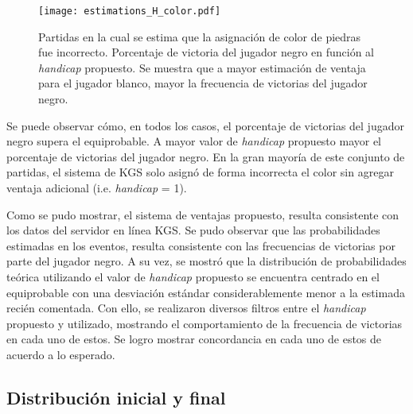 \documentclass[11pt,twoside,spanish]{report} %
\begin{document}
\begin{figure}[H]
    \centering
    \texttt{[image: estimations\_H\_color.pdf]}
    \caption{Partidas en la cual se estima que la asignaci\'on de color de piedras fue incorrecto. Porcentaje de victoria del jugador negro en funci\'on al \textit{handicap} propuesto.  Se muestra que a mayor estimaci\'on de ventaja para el jugador blanco,  mayor la frecuencia de victorias del jugador negro.}
    \label{fig:estimations_H_color}
\end{figure}

Se puede observar c\'omo, en todos los casos, el porcentaje de victorias del jugador negro supera el equiprobable. 
A mayor valor de \textit{handicap} propuesto mayor el porcentaje de victorias del jugador negro.
En la gran mayor\'ia de este conjunto de partidas, el sistema de KGS solo asign\'o de forma incorrecta el color sin agregar ventaja adicional (i.e. \textit{handicap} = 1).

Como se pudo mostrar, el sistema de ventajas propuesto, resulta consistente con los datos del servidor en l\'inea KGS.
Se pudo observar que las probabilidades estimadas en los eventos, resulta consistente con las frecuencias de victorias por parte del jugador negro.
A su vez, se mostr\'o que la distribuci\'on de probabilidades te\'orica utilizando el valor de \textit{handicap} propuesto se encuentra centrado en el equiprobable con una desviaci\'on est\'andar considerablemente menor a la estimada reci\'en comentada.
Con ello, se realizaron diversos filtros entre el \textit{handicap} propuesto y utilizado, mostrando el comportamiento de la frecuencia de victorias en cada uno de estos.
Se logro mostrar concordancia en cada uno de estos de acuerdo a lo esperado.







\vspace{7cm}
\subsection{Distribuci\'on inicial y final}
\end{document}
